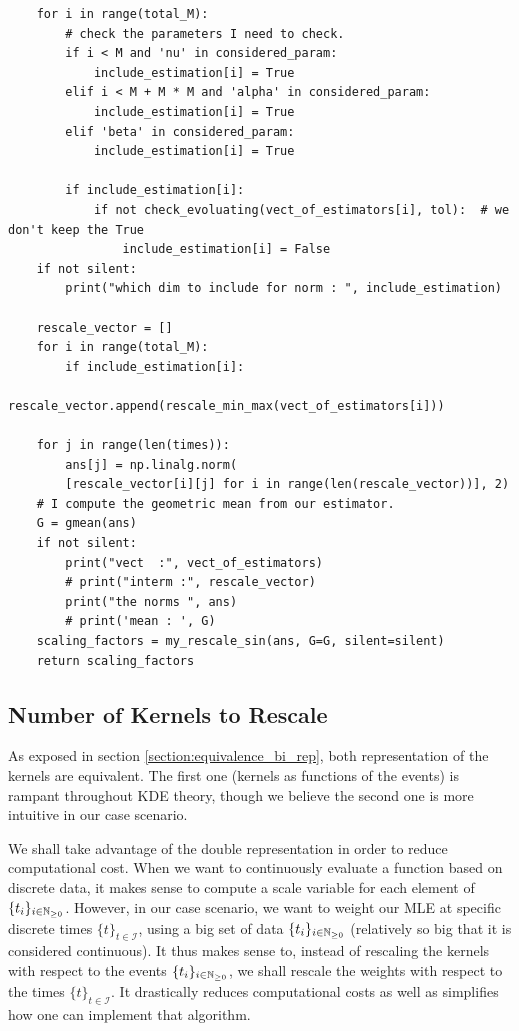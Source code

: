 \documentclass[11pt]{book}
\newcommand{\sequence}[1]{\{ #1 \}_{ i \in \N} }
\newcommand{\sequencetime}{\{t\}_{t \in \mathcal I} }
\begin{document}
\begin{verbatim}
    for i in range(total_M):
        # check the parameters I need to check.
        if i < M and 'nu' in considered_param:
            include_estimation[i] = True
        elif i < M + M * M and 'alpha' in considered_param:
            include_estimation[i] = True
        elif 'beta' in considered_param:
            include_estimation[i] = True

        if include_estimation[i]:
            if not check_evoluating(vect_of_estimators[i], tol):  # we don't keep the True
                include_estimation[i] = False
    if not silent:
        print("which dim to include for norm : ", include_estimation)

    rescale_vector = []
    for i in range(total_M):
        if include_estimation[i]:
            rescale_vector.append(rescale_min_max(vect_of_estimators[i]))

    for j in range(len(times)):
        ans[j] = np.linalg.norm(
        [rescale_vector[i][j] for i in range(len(rescale_vector))], 2)
    # I compute the geometric mean from our estimator.
    G = gmean(ans)
    if not silent:
        print("vect  :", vect_of_estimators)
        # print("interm :", rescale_vector)
        print("the norms ", ans)
        # print('mean : ', G)
    scaling_factors = my_rescale_sin(ans, G=G, silent=silent)
    return scaling_factors
\end{verbatim}

\subsection{Number of Kernels to Rescale}
As exposed in section \ref{section:equivalence_bi_rep}, both representation of the kernels are equivalent. The first one (kernels as functions of the events) is rampant throughout KDE theory, though we believe the second one is more intuitive in our case scenario.

We shall take advantage of the double representation in order to reduce computational cost. When we want to continuously evaluate a function based on discrete data, it makes sense to compute a scale variable for each element of $\sequence{t_i}$. However, in our case scenario, we want to weight our MLE at specific discrete times $\sequencetime$, using a big set of data $\sequence{t_i}$ (relatively so big that it is considered continuous). It thus makes sense to, instead of rescaling the kernels with respect to the events $\sequence{t_i}$, we shall rescale the weights with respect to the times $\sequencetime$. It drastically reduces computational costs as well as simplifies how one can implement that algorithm.
\end{document}
